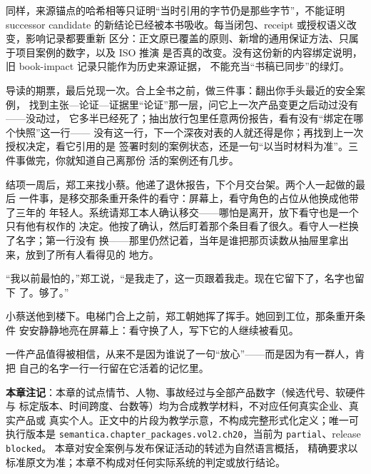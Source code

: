 同样，来源锚点的哈希相等只证明“当时引用的字节仍是那些字节”，不能证明 successor
candidate 的新结论已经被本书吸收。每当闭包、receipt 或授权语义改变，影响记录都要重新
区分：正文原已覆盖的原则、新增的通用保证方法、只属于项目案例的数字，以及 ISO 推演
是否真的改变。没有这份新的内容绑定说明，旧 book-impact 记录只能作为历史来源证据，
不能充当“书稿已同步”的绿灯。

导读的期票，最后兑现一次。合上全书之前，做三件事：翻出你手头最近的安全案例，
找到主张—论证—证据里“论证”那一层，问它上一次产品变更之后动过没有——没动过，
它多半已经死了；抽出放行包里任意两份报告，看有没有“绑定在哪个快照”这一行——
没有这一行，下一个深夜对表的人就还得是你；再找到上一次授权决定，看它引用的是
签署时刻的案例状态，还是一句“以当时材料为准”。三件事做完，你就知道自己离那份
活的案例还有几步。

结项一周后，郑工来找小蔡。他递了退休报告，下个月交台架。两个人一起做的最后
一件事，是移交那条重开条件的看守：屏幕上，看守角色的占位从他换成他带了三年的
年轻人。系统请郑工本人确认移交——哪怕是离开，放下看守也是一个只有他有权作的
决定。他按了确认，然后盯着那个条目看了很久。看守人一栏换了名字；第一行没有
换——那里仍然记着，当年是谁把那页读数从抽屉里拿出来，放到了所有人看得见的
地方。

“我以前最怕的，”郑工说，“是我走了，这一页跟着我走。现在它留下了，名字也留下
了。够了。”

小蔡送他到楼下。电梯门合上之前，郑工朝她挥了挥手。她回到工位，那条重开条件
安安静静地亮在屏幕上：看守换了人，写下它的人继续被看见。

一件产品值得被相信，从来不是因为谁说了一句“放心”——而是因为有一群人，肯把
自己的名字一行一行留在它活着的记忆里。


\begin{noteblock}
\textbf{本章注记}：本章的试点情节、人物、事故经过与全部产品数字（候选代号、软硬件与
标定版本、时间跨度、台数等）均为合成教学材料，不对应任何真实企业、真实产品或
真实个人。正文中的片段为教学示意，不构成完整形式化定义；唯一可执行版本是
\nolinkurl{semantica.chapter_packages.vol2.ch20}，当前为 \nolinkurl{partial}、release \nolinkurl{blocked}。
本章对安全案例与发布保证活动的转述为自然语言概括，
精确要求以标准原文为准；本章不构成对任何实际系统的判定或放行结论。
\end{noteblock}
